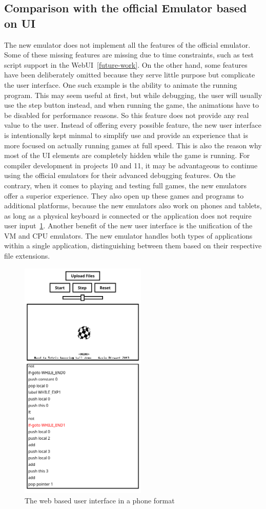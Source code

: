\subsection{Comparison with the official Emulator based on UI}
The new emulator does not implement all the features of the official emulator. Some of these missing features are missing due to time constraints, such as test script support in the WebUI~\ref{future-work}. On the other hand, some features have been deliberately omitted because they serve little purpose but complicate the user interface.
One such example is the ability to animate the running program. This may seem useful at first, but while debugging, the user will usually use the step button instead, and when running the game, the animations have to be disabled for performance reasons. So this feature does not provide any real value to the user.
Instead of offering every possible feature, the new user interface is intentionally kept minmal to simplify use and provide an experience that is more focused on actually running games at full speed. This is also the reason why most of the UI elements are completely hidden while the game is running.
For compiler development in projects 10 and 11, it may be advantageous to continue using the official emulators for their advanced debugging features.
On the contrary, when it comes to playing and testing full games, the new emulators offer a superior experience. They also open up these games and programs to additional platforms, because the new emulators also work on phones and tablets, as long as a physical keyboard is connected or the application does not require user input~\ref{fig:ui-demo-mobile}.
Another benefit of the new user interface is the unification of the VM and CPU emulators. The new emulator handles both types of applications within a single application, distinguishing between them based on their respective file extensions.
\begin{center}
  \begin{figure}[ht]
    \centering
    \includegraphics[width=6cm]{fig/ui-demo-mobile.png}
    \caption{The web based user interface in a phone format}%
    \label{fig:ui-demo-mobile}
  \end{figure}
\end{center}
